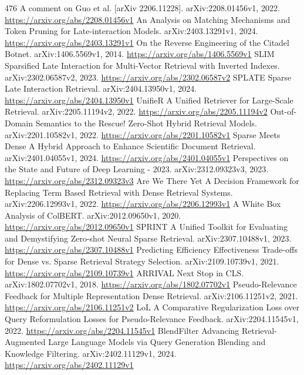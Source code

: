 \documentclass[11pt]{article}
\begin{document}
\begin{thebibliography}{476}
 A comment on Guo et al. [arXiv 2206.11228]. arXiv:2208.01456v1, 2022. \url{https://arxiv.org/abs/2208.01456v1}
 An Analysis on Matching Mechanisms and Token Pruning for Late-interaction Models. arXiv:2403.13291v1, 2024. \url{https://arxiv.org/abs/2403.13291v1}
 On the Reverse Engineering of the Citadel Botnet. arXiv:1406.5569v1, 2014. \url{https://arxiv.org/abs/1406.5569v1}
 SLIM Sparsified Late Interaction for Multi-Vector Retrieval with Inverted Indexes. arXiv:2302.06587v2, 2023. \url{https://arxiv.org/abs/2302.06587v2}
 SPLATE Sparse Late Interaction Retrieval. arXiv:2404.13950v1, 2024. \url{https://arxiv.org/abs/2404.13950v1}
 UnifieR A Unified Retriever for Large-Scale Retrieval. arXiv:2205.11194v2, 2022. \url{https://arxiv.org/abs/2205.11194v2}
 Out-of-Domain Semantics to the Rescue! Zero-Shot Hybrid Retrieval Models. arXiv:2201.10582v1, 2022. \url{https://arxiv.org/abs/2201.10582v1}
 Sparse Meets Dense A Hybrid Approach to Enhance Scientific Document Retrieval. arXiv:2401.04055v1, 2024. \url{https://arxiv.org/abs/2401.04055v1}
 Perspectives on the State and Future of Deep Learning - 2023. arXiv:2312.09323v3, 2023. \url{https://arxiv.org/abs/2312.09323v3}
 Are We There Yet A Decision Framework for Replacing Term Based Retrieval with Dense Retrieval Systems. arXiv:2206.12993v1, 2022. \url{https://arxiv.org/abs/2206.12993v1}
 A White Box Analysis of ColBERT. arXiv:2012.09650v1, 2020. \url{https://arxiv.org/abs/2012.09650v1}
 SPRINT A Unified Toolkit for Evaluating and Demystifying Zero-shot Neural Sparse Retrieval. arXiv:2307.10488v1, 2023. \url{https://arxiv.org/abs/2307.10488v1}
 Predicting Efficiency Effectiveness Trade-offs for Dense vs. Sparse Retrieval Strategy Selection. arXiv:2109.10739v1, 2021. \url{https://arxiv.org/abs/2109.10739v1}
 ARRIVAL Next Stop in CLS. arXiv:1802.07702v1, 2018. \url{https://arxiv.org/abs/1802.07702v1}
 Pseudo-Relevance Feedback for Multiple Representation Dense Retrieval. arXiv:2106.11251v2, 2021. \url{https://arxiv.org/abs/2106.11251v2}
 LoL A Comparative Regularization Loss over Query Reformulation Losses for Pseudo-Relevance Feedback. arXiv:2204.11545v1, 2022. \url{https://arxiv.org/abs/2204.11545v1}
 BlendFilter Advancing Retrieval-Augmented Large Language Models via Query Generation Blending and Knowledge Filtering. arXiv:2402.11129v1, 2024. \url{https://arxiv.org/abs/2402.11129v1}

\end{thebibliography}
\end{document}
